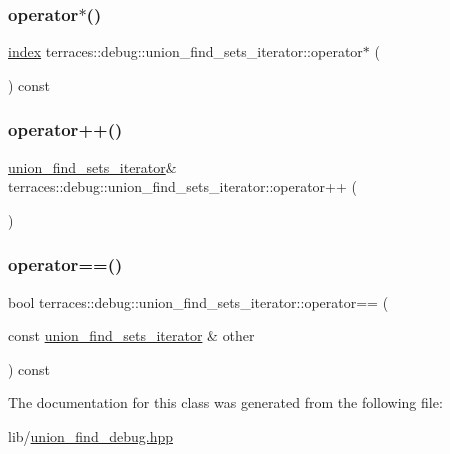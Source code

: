\subsubsection{\texorpdfstring{operator$\ast$()}{operator*()}}
{\footnotesize\ttfamily \hyperlink{namespaceterraces_adbc33ccb543d1634e96d0eb02e472c77}{index} terraces\+::debug\+::union\+\_\+find\+\_\+sets\+\_\+iterator\+::operator$\ast$ (\begin{DoxyParamCaption}{ }\end{DoxyParamCaption}) const\hspace{0.3cm}{\ttfamily [inline]}}

\mbox{\label{classterraces_1_1debug_1_1union__find__sets__iterator_a8f020f83b8692207b4b69ba3e3b69828}} 
\subsubsection{\texorpdfstring{operator++()}{operator++()}}
{\footnotesize\ttfamily \hyperlink{classterraces_1_1debug_1_1union__find__sets__iterator}{union\+\_\+find\+\_\+sets\+\_\+iterator}\& terraces\+::debug\+::union\+\_\+find\+\_\+sets\+\_\+iterator\+::operator++ (\begin{DoxyParamCaption}{ }\end{DoxyParamCaption})\hspace{0.3cm}{\ttfamily [inline]}}

\mbox{\label{classterraces_1_1debug_1_1union__find__sets__iterator_a9e8708a0c9ed133d5615723afa719b19}} 
\subsubsection{\texorpdfstring{operator==()}{operator==()}}
{\footnotesize\ttfamily bool terraces\+::debug\+::union\+\_\+find\+\_\+sets\+\_\+iterator\+::operator== (\begin{DoxyParamCaption}\item[{const \hyperlink{classterraces_1_1debug_1_1union__find__sets__iterator}{union\+\_\+find\+\_\+sets\+\_\+iterator} \&}]{other }\end{DoxyParamCaption}) const\hspace{0.3cm}{\ttfamily [inline]}}



The documentation for this class was generated from the following file\+:\begin{DoxyCompactItemize}
\item 
lib/\hyperlink{union__find__debug_8hpp}{union\+\_\+find\+\_\+debug.\+hpp}\end{DoxyCompactItemize}
